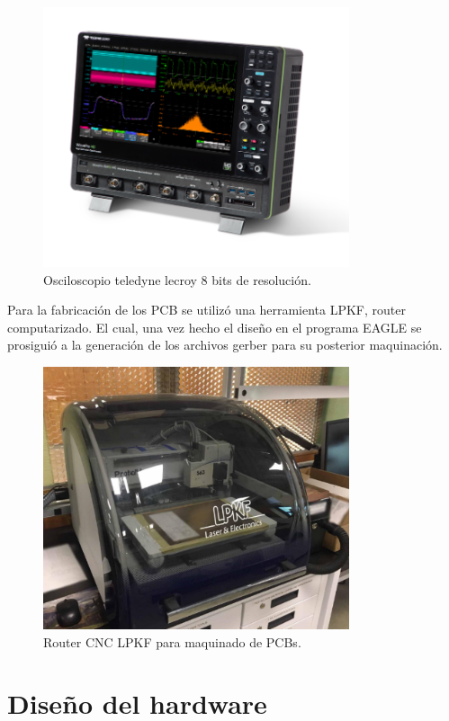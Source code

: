 \begin{figure}[H]
\centering
\includegraphics[width=9cm]{Capitulo3/figs/oscilo.png}
\caption{Osciloscopio teledyne lecroy 8 bits de resolución.}
\end{figure}

Para la fabricación de los PCB se utilizó una herramienta LPKF, router computarizado. El cual, una vez hecho el diseño en el programa EAGLE se prosiguió a la generación de los archivos gerber para su posterior maquinación. 

\begin{figure}[H]
\centering
\includegraphics[width=9cm]{Capitulo3/figs/proto.png}
\caption{Router CNC LPKF para maquinado de PCBs.}
\end{figure}
\newpage


\section{Diseño del hardware}


